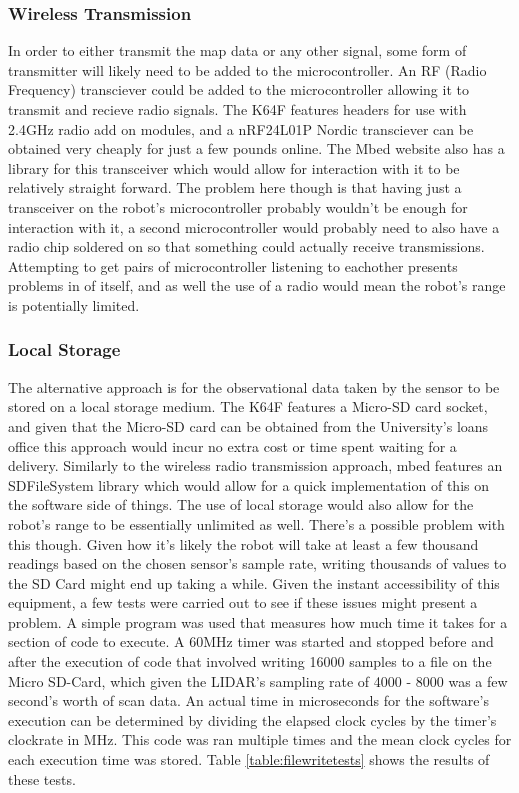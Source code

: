 					\subsubsection{Wireless Transmission}
					In order to either transmit the map data or any other signal, some form of transmitter will likely need to be added to the microcontroller. An RF (Radio Frequency) transciever could be added to the microcontroller allowing it to transmit and recieve radio signals. The K64F features headers for use with 2.4GHz radio add on modules, and a nRF24L01P Nordic transciever can be obtained very cheaply for just a few pounds online. The Mbed website also has a library\citep{nRF24L01Plibrary} for this transceiver which would allow for interaction with it to be relatively straight forward. The problem here though is that having just a transceiver on the robot's microcontroller probably wouldn't be enough for interaction with it, a second microcontroller would probably need to also have a radio chip soldered on so that something could actually receive transmissions. Attempting to get pairs of microcontroller listening to eachother presents problems in of itself, and as well the use of a radio would mean the robot's range is potentially limited.
					
					\subsubsection{Local Storage}
					The alternative approach is for the observational data taken by the sensor to be stored on a local storage medium. The K64F features a Micro-SD card socket, and given that the Micro-SD card can be obtained from the University's loans office this approach would incur no extra cost or time spent waiting for a delivery. Similarly to the wireless radio transmission approach, mbed features an SDFileSystem library\citep{sdfilesystemlibrary} which would allow for a quick implementation of this on the software side of things. The use of local storage would also allow for the robot's range to be essentially unlimited as well. There's a possible problem with this though. Given how it's likely the robot will take at least a few thousand readings based on the chosen sensor's sample rate, writing thousands of values to the SD Card might end up taking a while. Given the instant accessibility of this equipment, a few tests were carried out to see if these issues might present a problem. A simple program was used that measures how much time it takes for a section of code to execute. A 60MHz timer was started and stopped before and after the execution of code that involved writing 16000 samples to a file on the Micro SD-Card, which given the LIDAR's sampling rate of 4000 - 8000 was a few second's worth of scan data. An actual time in microseconds for the software's execution can be determined by dividing the elapsed clock cycles by the timer's clockrate in MHz. This code was ran multiple times and the mean clock cycles for each execution time was stored. Table \ref{table:filewritetests} shows the results of these tests.
					
